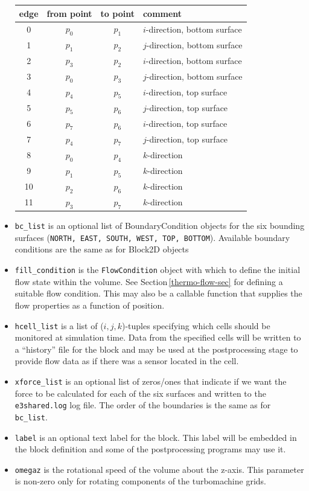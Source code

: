 \begin{itemize}
\begin{table}
\begin{center}
\begin{tabular}{cccl}
      \hline\hline
      edge & from point & to point & comment \\ 
      \hline
      0  & $p_0$      & $p_1$    & $i$-direction, bottom surface \\
      1  & $p_1$      & $p_2$    & $j$-direction, bottom surface \\
      2  & $p_3$      & $p_2$    & $i$-direction, bottom surface \\
      3  & $p_0$      & $p_3$    & $j$-direction, bottom surface \\
      4  & $p_4$      & $p_5$    & $i$-direction, top surface \\
      5  & $p_5$      & $p_6$    & $j$-direction, top surface \\
      6  & $p_7$      & $p_6$    & $i$-direction, top surface \\
      7  & $p_4$      & $p_7$    & $j$-direction, top surface \\
      8  & $p_0$      & $p_4$    & $k$-direction \\
      9  & $p_1$      & $p_5$    & $k$-direction \\
      10 & $p_2$      & $p_6$    & $k$-direction \\
      11 & $p_3$      & $p_7$    & $k$-direction \\
      \hline \hline
    \end{tabular}
  \end{center}
\end{table}
\item \texttt{bc\_list} is an optional list of BoundaryCondition objects for the 
  six bounding surfaces (\texttt{NORTH, EAST, SOUTH, WEST, TOP, BOTTOM}).
  Available boundary conditions are the same as for Block2D objects
\item \texttt{fill\_condition} is the \texttt{FlowCondition} object with which to
  define the initial flow state within the volume.
  See Section\,\ref{thermo-flow-sec} for defining a suitable flow condition.
  This may also be a callable function that supplies the flow properties as
  a function of position.
\item \texttt{hcell\_list} is a list of ($i,j,k$)-tuples specifying which
  cells should be monitored at simulation time.
  Data from the specified cells will be written to a ``history'' file for the
  block and may be used at the postprocessing stage to provide flow data as if
  there was a sensor located in the cell.
\item \texttt{xforce\_list} is an optional list of zeros/ones that indicate if we
  want the force to be calculated for each of the six surfaces and written to the 
  \texttt{e3shared.log} log file.
  The order of the boundaries is the same as for \texttt{bc\_list}.
\item \texttt{label} is an optional text label for the block.  This label
  will be embedded in the block definition and some of the postprocessing
  programs may use it.
\item \texttt{omegaz} is the rotational speed of the volume about the z-axis.
  This parameter is non-zero only for rotating components of the turbomachine grids.
\end{itemize} 

